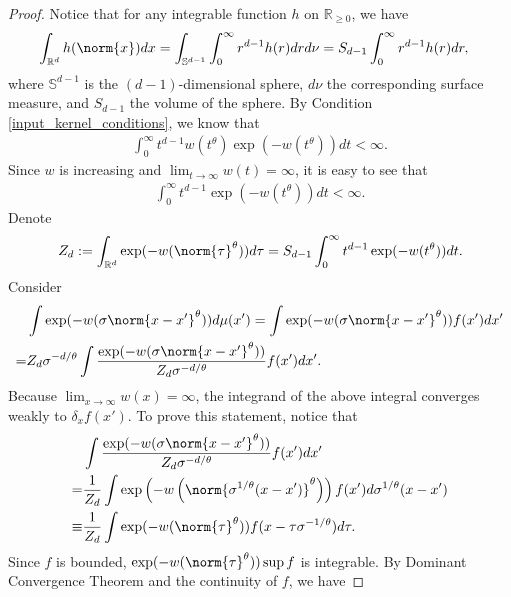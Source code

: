 \begin{proof}
    Notice that for any integrable function $h$ on $\mathbb{R}_{\geq 0}$, we have
    \begin{align}
         & \int_{\mathbb{R}^d} h(\norm{x}) dx = \int_{\mathbb{S}^{d-1}} \int_0^{\infty} r^{d-1}h(r) dr d\nu=S_{d-1} \int_0^{\infty} r^{d-1}h(r) dr,
    \end{align}
    where $\mathbb{S}^{d-1}$ is the $(d-1)$-dimensional sphere, $d\nu$ the corresponding surface measure, and $S_{d-1}$ the volume of the sphere. By Condition \ref{input_kernel_conditions}, we know that
    \begin{align}
        \int_0^{\infty} t^{d-1} w(t^{\theta}) \exp(-w(t^{\theta}))dt < \infty.
    \end{align}
    Since $w$ is increasing and $\lim_{t \to \infty} w(t) = \infty$, it is easy to see that
    \begin{align}
        \int_0^{\infty} t^{d-1} \exp(-w(t^{\theta}))dt < \infty.
    \end{align}
    Denote
    \begin{align}
        Z_d :=\int_{\mathbb{R}^d}\exp(-w(\norm{\tau}^{\theta})) d \tau = S_{d-1} \int_0^{\infty} t^{d-1}\exp(-w(t^{\theta})) dt.
    \end{align}
    Consider
    \begin{align}
          & \int \exp(-w(\sigma\norm{x-x'}^{\theta}))d\mu(x') = \int \exp(-w(\sigma\norm{x-x'}^{\theta})) f(x')dx' \nonumber \\
        = & Z_d \sigma^{-d/\theta}\int \frac{\exp(-w(\sigma\norm{x-x'}^{\theta}))}{Z_d \sigma^{-d/\theta}} f(x')dx'.
    \end{align}
    Because $\lim_{x \to \infty} w(x) = \infty$, the integrand of the above integral converges weakly to $\delta_x f(x')$. To prove this statement, notice that
    \begin{align}
               & \int \frac{\exp(-w(\sigma\norm{x-x'}^{\theta}))}{Z_d \sigma^{-d/\theta}} f(x')dx' \nonumber                                          \\
        =      & \frac{1}{Z_d} \int \exp\left(-w \left(\norm{\sigma^{1/\theta}(x-x')}^{\theta}\right)\right) f(x') d\sigma^{1/\theta}(x-x') \nonumber \\
        \equiv & \frac{1}{Z_d} \int \exp(-w(\norm{\tau}^{\theta})) f(x-\tau \sigma^{-1/\theta}) d\tau.
    \end{align}
    Since $f$ is bounded, $\exp(-w(\norm{\tau}^{\theta})) \sup f$ is integrable. By Dominant Convergence Theorem and the continuity of $f$, we have

\end{proof}
